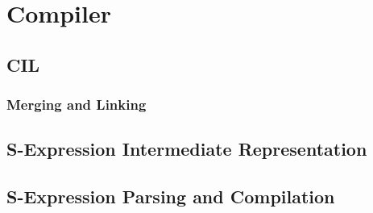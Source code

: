 \chapter{Compiler}
\section{CIL}
\subsection{Merging and Linking}
\section{S-Expression Intermediate Representation}
\section{S-Expression Parsing and Compilation}
